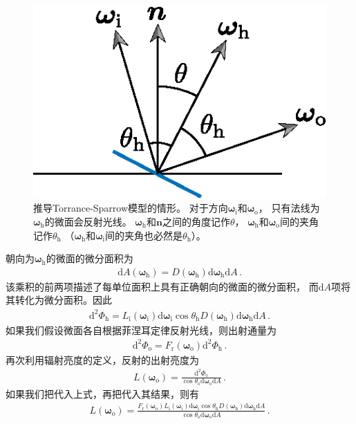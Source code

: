\begin{figure}[htbp]
    \centering
    \includegraphics[width=0.35\linewidth]{Pictures/chap08/TorranceSparrowSetting.eps}
    \caption{推导Torrance-Sparrow模型的情形。
    对于方向${\bm\omega}_{\mathrm{i}}$和${\bm\omega}_{\mathrm{o}}$，
    只有法线为${\bm\omega}_{\mathrm{h}}$的微面会反射光线。
    ${\bm\omega}_{\mathrm{h}}$和$\bm n$之间的角度记作$\theta$，
    ${\bm\omega}_{\mathrm{h}}$和${\bm\omega}_{\mathrm{o}}$间的夹角记作$\theta_{\mathrm{h}}$
    （${\bm\omega}_{\mathrm{h}}$和${\bm\omega}_{\mathrm{i}}$间的夹角也必然是$\theta_{\mathrm{h}}$）。}
    \label{fig:8.20}
\end{figure}

朝向为${\bm\omega}_{\mathrm{h}}$的微面的微分面积为
\begin{align*}
    \mathrm{d}A({\bm\omega}_{\mathrm{h}})=D({\bm\omega}_{\mathrm{h}})\mathrm{d}{\bm\omega}_{\mathrm{h}}\mathrm{d}A\, .
\end{align*}
该乘积的前两项描述了每单位面积上具有正确朝向的微面的微分面积，
而$\mathrm{d}A$项将其转化为微分面积。因此
\begin{align}\label{eq:8.15}
    \mathrm{d}^2\varPhi_{\mathrm{h}}=L_{\mathrm{i}}({\bm\omega}_{\mathrm{i}})
    \mathrm{d}{\bm\omega}_{\mathrm{i}}\cos\theta_{\mathrm{h}}
    D({\bm\omega}_{\mathrm{h}})\mathrm{d}{\bm\omega}_{\mathrm{h}}\mathrm{d}A\, .
\end{align}
如果我们假设微面各自根据菲涅耳定律反射光线，则出射通量为
\begin{align}\label{eq:8.16}
    \mathrm{d}^2\varPhi_{\mathrm{o}}=F_{\mathrm{r}}({\bm\omega}_{\mathrm{o}})\mathrm{d}^2\varPhi_{\mathrm{h}}\, .
\end{align}
再次利用辐射亮度的定义，反射的出射亮度为
\begin{align*}
    L({\bm\omega}_{\mathrm{o}})=\frac{\mathrm{d}^2\varPhi_{\mathrm{o}}}
    {\cos\theta_{\mathrm{o}}\mathrm{d}{\bm\omega}_{\mathrm{o}}\mathrm{d}A}\, .
\end{align*}
如果我们把代入上式，再把代入其结果，则有
\begin{align*}
    L({\bm\omega}_{\mathrm{o}})=\frac{F_{\mathrm{r}}({\bm\omega}_{\mathrm{o}})
    L_{\mathrm{i}}({\bm\omega}_{\mathrm{i}})\mathrm{d}{\bm\omega}_{\mathrm{i}}\cos\theta_{\mathrm{h}}
    D({\bm\omega}_{\mathrm{h}})\mathrm{d}{\bm\omega}_{\mathrm{h}}\mathrm{d}A}
    {\cos\theta_{\mathrm{o}}\mathrm{d}{\bm\omega}_{\mathrm{o}}\mathrm{d}A}\, .
\end{align*}

